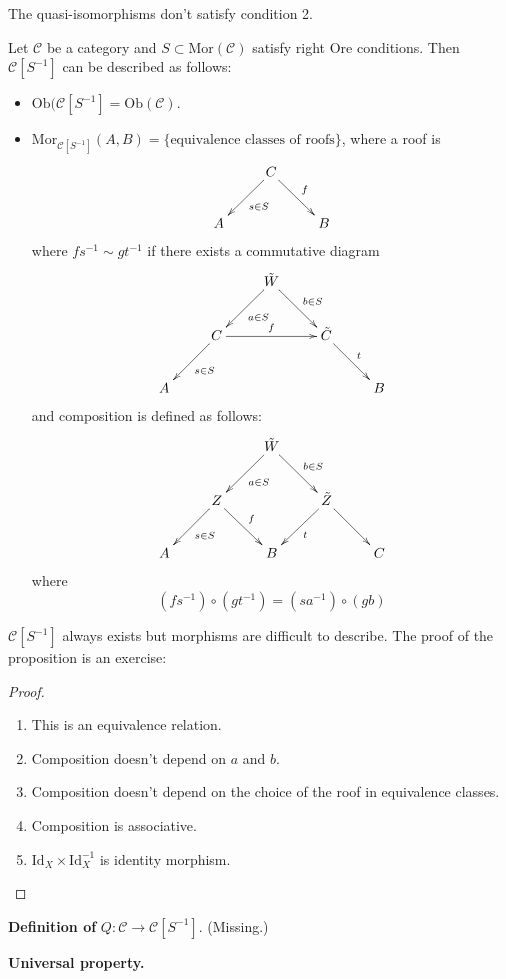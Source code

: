 The quasi-isomorphisms don't satisfy condition 2.

\begin{proposition}
\label{proposition-caracterization-of-derived-category}
Let $\mathcal{C}$ be a category and $S\subset \text{Mor}(\mathcal{C})$ satisfy
right Ore conditions. Then $\mathcal{C}[S^{-1}]$ can be described as follows:
\begin{itemize}
\item $\text{Ob}(\mathcal{C}[S^{-1}]=\text{Ob}(\mathcal{C})$.
\item $\text{Mor}_{\mathcal{C}[S^{-1}]}(A,B)=\{\text{equivalence classes of
roofs}\}$, where a roof is
$$
\xymatrix{
& C\ar[dl]^{s\in S}\ar[dr]^{f}\\
A&&B
}
$$
where $fs^{-1}\sim gt^{-1}$ if there exists a commutative diagram
$$
\xymatrix{
& & \tilde{W} \ar[ld]^{a \in S} \ar[dr]^{b \in S} & & \\
& C \ar[ld]^{s \in S} \ar[rr]^{f} & & \tilde{C} \ar[rd]^{t} & \\
A & & & & B
}
$$
and composition is defined as follows:
$$
\xymatrix{
& & \tilde{W}\ar[ld]^{a \in S}\ar[dr]^{b \in S}\\
&Z\ar[ld]^{s \in S}\ar[dr]^{f} & &  \tilde{Z}\ar[dr]\ar[dl]^{t}\\
A & &B & & C
}
$$
where
$$
(fs^{-1})\circ (gt^{-1})=(sa^{-1})\circ(gb)
$$
\end{itemize}
\end{proposition}

$\mathcal{C}[S^{-1}]$ always exists but morphisms are difficult to describe. The
proof of the proposition is an exercise:

\begin{proof}
\begin{enumerate}
\item This is an equivalence relation.
\item Composition doesn't depend on $a$ and $b$.
\item Composition doesn't depend on the choice of the roof in equivalence
classes.
\item Composition is associative.
\item $\text{Id}_X \times \text{Id}_X^{-1}$ is identity morphism.
\end{enumerate}
\end{proof}

{\bf Definition of} $Q:\mathcal{C} \to \mathcal{C}[S^{-1}]$. (Missing.)

{\bf Universal property.}


